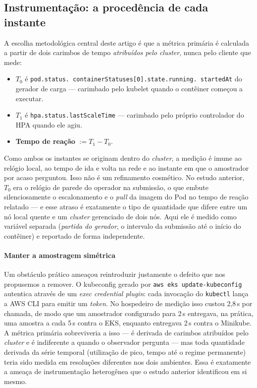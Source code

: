 \documentclass[conference]{IEEEtran}
\begin{document}
\subsection{Instrumentação: a procedência de cada instante}
\label{sec:instrumentacao}

A escolha metodológica central deste artigo é que a métrica primária é calculada
a partir de dois carimbos de tempo \emph{atribuídos pelo cluster}, nunca pelo
cliente que mede:

\begin{itemize}
\item $T_0$ é \texttt{pod.\allowbreak status.\allowbreak
containerStatuses[0].\allowbreak state.\allowbreak running.\allowbreak
startedAt} do gerador de carga --- carimbado pelo kubelet quando o contêiner
começou a executar.
\item $T_1$ é \texttt{hpa.status.lastScaleTime} --- carimbado pelo próprio
controlador do HPA quando ele agiu.
\item \textbf{Tempo de reação} $:= T_1 - T_0$.
\end{itemize}

Como ambos os instantes se originam dentro do \emph{cluster}, a medição é imune
ao relógio local, ao tempo de ida e volta na rede e ao instante em que o
amostrador por acaso perguntou. Isso não é um refinamento cosmético. No estudo
anterior, $T_0$ era o relógio de parede do operador na submissão, o que embute
silenciosamente o escalonamento e o \emph{pull} da imagem do Pod no tempo de
reação relatado --- e esse atraso é exatamente o tipo de quantidade que difere
entre um nó local quente e um \emph{cluster} gerenciado de dois nós. Aqui ele é
medido como variável separada (\emph{partida do gerador}, o intervalo da
submissão até o início do contêiner) e reportado de forma independente.

\paragraph{Manter a amostragem simétrica} Um obstáculo prático ameaçou
reintroduzir justamente o defeito que nos propusemos a remover. O kubeconfig
gerado por \texttt{aws eks update-kubeconfig} autentica através de um \emph{exec
credential plugin}: cada invocação do \texttt{kubectl} lança a AWS CLI para
emitir um \emph{token}. No hospedeiro de medição isso custou 2,8\,s por chamada,
de modo que um amostrador configurado para 2\,s entregava, na prática, uma
amostra a cada 5\,s contra o EKS, enquanto entregava 2\,s contra o Minikube. A
métrica primária sobreviveria a isso --- é derivada de carimbos atribuídos pelo
\emph{cluster} e é indiferente a quando o observador pergunta --- mas toda
quantidade derivada da série temporal (utilização de pico, tempo até o regime
permanente) teria sido medida em resoluções diferentes nos dois ambientes. Essa é
exatamente a ameaça de instrumentação heterogênea que o estudo anterior
identificou em si mesmo.
\end{document}
